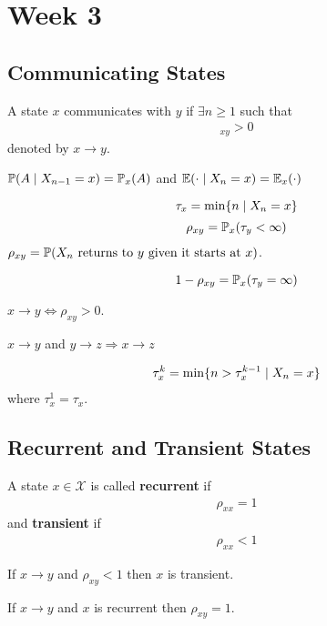 \documentclass[12pt,a4paper]{article}
\begin{document}
\section{Week 3}
\subsection{Communicating States}
\begin{defn}
A state $x$ communicates with $y$ if $\exists n\geq 1$ such that 
\begin{align*}
[\vb P^n]_{xy} > 0
\end{align*}
denoted by $x \to y$. 
\end{defn}
\begin{note}
$\P(A \given X_{n-1} = x) = \P_x(A)$ and $\E(\cdot \given X_n = x) = \E_x(\cdot)$
\end{note}
\begin{defn}
\[\tau_x = \min \{n \given X_n = x\}\]
\[\rho_{xy} = \P_x(\tau_y < \infty)\]
$\rho_{xy} = \P(\text{$X_n$ returns to $y$ given it starts at $x$)}$. 
\end{defn}
\begin{note}
\[1 - \rho_{xy} = \P_x(\tau_y = \infty)\]
\end{note}
\begin{lemma}
$x\to y \iff \rho_{xy} > 0$.  
\end{lemma}
\begin{lemma}[Transitivity]
$x\to y$ and $y\to z \Rightarrow x \to z$
\end{lemma}
\begin{defn}
\label{kthret}
\begin{align*}
\tau_x^k = \min \{n > \tau_x^{k-1} \given X_n = x\}
\end{align*}
where $\tau_x^1 = \tau_x$. 
\end{defn}
\subsection{Recurrent and Transient States}
\begin{defn}
\label{recurrent}
A state $x\in \mathcal{X}$ is called \textbf{recurrent} if 
\begin{align*}
\rho_{xx} = 1
\end{align*}
and \textbf{transient} if 
\begin{align*}
\rho_{xx} < 1
\end{align*}
\end{defn}
\begin{thm}
\label{escpath}
If $x\to y$ and $\rho_{xy} < 1$ then $x$ is transient.
\end{thm}
\begin{thm}
If $x\to y$ and $x$ is recurrent then $\rho_{xy} = 1$. 
\end{thm}
\newpage
\end{document}
